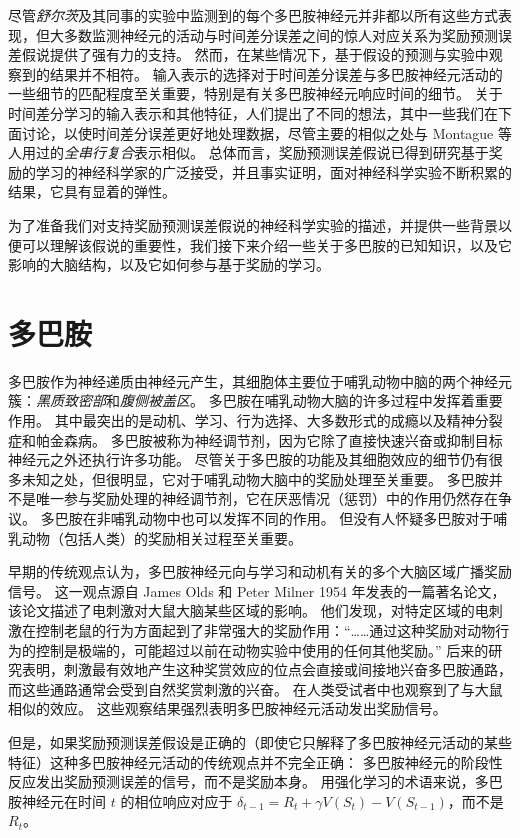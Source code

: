 尽管\textit{舒尔茨}及其同事的实验中监测到的每个多巴胺神经元并非都以所有这些方式表现，但大多数监测神经元的活动与时间差分误差之间的惊人对应关系为奖励预测误差假说提供了强有力的支持。
然而，在某些情况下，基于假设的预测与实验中观察到的结果并不相符。
输入表示的选择对于时间差分误差与多巴胺神经元活动的一些细节的匹配程度至关重要，特别是有关多巴胺神经元响应时间的细节。
关于时间差分学习的输入表示和其他特征，人们提出了不同的想法，其中一些我们在下面讨论，以使时间差分误差更好地处理数据，尽管主要的相似之处与 Montague 等人用过的\textit{全串行复合}表示相似。
总体而言，奖励预测误差假说已得到研究基于奖励的学习的神经科学家的广泛接受，并且事实证明，面对神经科学实验不断积累的结果，它具有显着的弹性。


为了准备我们对支持奖励预测误差假说的神经科学实验的描述，并提供一些背景以便可以理解该假说的重要性，我们接下来介绍一些关于多巴胺的已知知识，以及它影响的大脑结构，以及它如何参与基于奖励的学习。


\section{多巴胺} \label{sec:dopamine}

多巴胺作为神经递质由神经元产生，其细胞体主要位于哺乳动物中脑的两个神经元簇：\textit{黑质致密部}和\textit{腹侧被盖区}。
多巴胺在哺乳动物大脑的许多过程中发挥着重要作用。
其中最突出的是动机、学习、行为选择、大多数形式的成瘾以及精神分裂症和帕金森病。
多巴胺被称为神经调节剂，因为它除了直接快速兴奋或抑制目标神经元之外还执行许多功能。
尽管关于多巴胺的功能及其细胞效应的细节仍有很多未知之处，但很明显，它对于哺乳动物大脑中的奖励处理至关重要。
多巴胺并不是唯一参与奖励处理的神经调节剂，它在厌恶情况（惩罚）中的作用仍然存在争议。
多巴胺在非哺乳动物中也可以发挥不同的作用。
但没有人怀疑多巴胺对于哺乳动物（包括人类）的奖励相关过程至关重要。


早期的传统观点认为，多巴胺神经元向与学习和动机有关的多个大脑区域广播奖励信号。
这一观点源自 James Olds 和 Peter Milner 1954 年发表的一篇著名论文，该论文描述了电刺激对大鼠大脑某些区域的影响。
他们发现，对特定区域的电刺激在控制老鼠的行为方面起到了非常强大的奖励作用：“……通过这种奖励对动物行为的控制是极端的，可能超过以前在动物实验中使用的任何其他奖励。”\cite{olds1954positive}
后来的研究表明，刺激最有效地产生这种奖赏效应的位点会直接或间接地兴奋多巴胺通路，而这些通路通常会受到自然奖赏刺激的兴奋。
在人类受试者中也观察到了与大鼠相似的效应。
这些观察结果强烈表明多巴胺神经元活动发出奖励信号。


但是，如果奖励预测误差假设是正确的（即使它只解释了多巴胺神经元活动的某些特征）这种多巴胺神经元活动的传统观点并不完全正确：
多巴胺神经元的阶段性反应发出奖励预测误差的信号，而不是奖励本身。
用强化学习的术语来说，多巴胺神经元在时间 $ t $ 的相位响应对应于 $ \delta_{t-1} = R_t + \gamma V(S_t) - V(S_{t-1}) $，而不是 $ R_t $。


